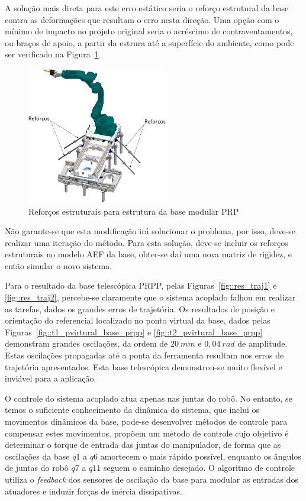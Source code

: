 A solução mais direta para este erro estático seria o reforço estrutural da base
contra as deformações que resultam o erro nesta direção. Uma opção com o mínimo
de impacto no projeto original seria o acréscimo de contraventamentos, ou braços
de apoio, a partir da estrura até a superfície do ambiente, como pode ser
verificado na Figura~\ref{fig::contraventamentos}

\begin{figure}[h!]
	\centering 
 	\includegraphics[width=0.55\textwidth]{figs/contraventamentos}
 	\caption{Reforços estruturais para estrutura da base modular PRP}
 	\label{fig::contraventamentos}
\end{figure}

Não garante-se que esta modificação irá solucionar o problema, por isso, deve-se
realizar uma iteração do método. Para esta solução, deve-se incluir os reforços
estruturais no modelo AEF da base, obter-se daí uma nova matriz de rigidez, e
então simular o novo sistema.

Para o resultado da base telescópica PRPP, pelas Figuras~\ref{fig::res_traj1} e
\ref{fig::res_traj2}, percebe-se claramente que o sistema acoplado falhou em
realizar as tarefas, dados os grandes erros de trajetória. Os resultados de
posição e orientação do referencial localizado no ponto virtual da base, dados
pelas Figuras~\ref{fig::t1_pvirtural_base_prpp} e
\ref{fig::t2_pvirtural_base_prpp} demonstram grandes oscilações, da ordem de
$20~mm$ e $0,04~rad$ de amplitude. Estas oscilações propagadas até a ponta da
ferramenta resultam nos erros de trajetória apresentados. Esta base telescópica
demonstrou-se muito flexível e inviável para a aplicação.

O controle do sistema acoplado atua apenas nas juntas do robô. No entanto, se
temos o suficiente conhecimento da dinâmica do sistema, que inclui os movimentos
dinâmicos da base, pode-se desenvolver métodos de controle para compensar estes
movimentos. \citet{lew2001simple} propõem um método de controle cujo objetivo é
determinar o torque de entrada das juntas do manipulador, de forma que as
oscilações da base $q1$ a $q6$ amortecem o mais rápido possível, enquanto os
ângulos de juntas do robô $q7$ a $q11$ seguem o caminho desejado. O algoritmo de
controle utiliza o \textit{feedback} dos sensores de oscilação da base para
modular as entradas dos atuadores e induzir forças de inércia dissipativas.

